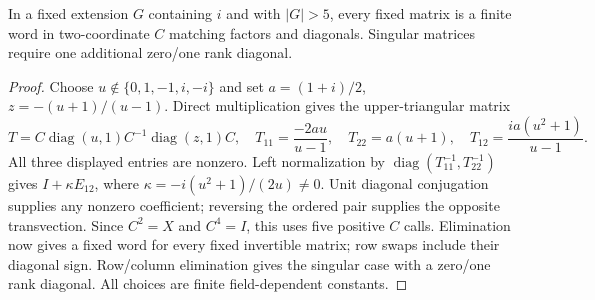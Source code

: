 \begin{paperlemma}
\label{lem:oddgroupedgenerator}
In a fixed extension $G$ containing $i$ and with $|G|>5$, every fixed
matrix is a finite word in two-coordinate $C$ matching factors and
diagonals. Singular matrices require one additional zero/one rank diagonal.
\end{paperlemma}
\begin{proof}
Choose $u\notin\{0,1,-1,i,-i\}$ and set $a=(1+i)/2$,
$z=-(u+1)/(u-1)$. Direct multiplication gives the upper-triangular
matrix
\[
 T=C\operatorname{diag}(u,1)C^{-1}\operatorname{diag}(z,1)C,
 \quad T_{11}=\frac{-2au}{u-1},\quad T_{22}=a(u+1),\quad
 T_{12}=\frac{ia(u^2+1)}{u-1}.
\]
All three displayed entries are nonzero. Left normalization by
$\operatorname{diag}(T_{11}^{-1},T_{22}^{-1})$ gives
$I+\kappa E_{12}$, where $\kappa=-i(u^2+1)/(2u)\ne0$.
Unit diagonal conjugation supplies any nonzero coefficient; reversing
the ordered pair supplies the opposite transvection. Since $C^2=X$
and $C^4=I$, this uses five positive $C$ calls. Elimination now gives
a fixed word for every fixed invertible matrix; row swaps include their
diagonal sign. Row/column elimination gives the singular case with a
zero/one rank diagonal. All choices are finite field-dependent constants.
\end{proof}


